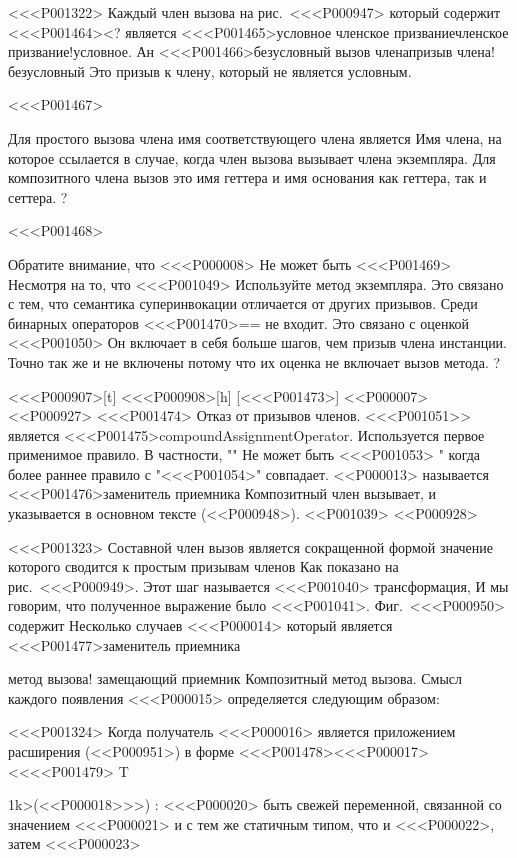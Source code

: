<<<P001322>%
Каждый член вызова на рис.~<<<P000947> который содержит
<<<P001464><? является
<<<P001465>{условное членское призвание}{членское призвание!условное}.
Ан
<<<P001466>{безусловный вызов члена}{призыв члена!безусловный}
Это призыв к члену, который не является условным.

<<<P001467>{%
Для простого вызова члена имя соответствующего члена является
Имя члена, на которое ссылается
в случае, когда член вызова вызывает члена экземпляра.
Для композитного члена вызов это имя геттера
и имя основания как геттера, так и сеттера.%
?

<<<P001468>{%
Обратите внимание, что <<<P000008> Не может быть <<<P001469>
Несмотря на то, что <<<P001049> Используйте метод экземпляра.
Это связано с тем, что семантика суперинвокации отличается от
других призывов.
Среди бинарных операторов <<<P001470>{==} не входит.
Это связано с оценкой <<<P001050>
Он включает в себя больше шагов, чем призыв члена инстанции.
Точно так же \lit{\&\&} и \lit{ | |} не включены
потому что их оценка не включает вызов метода.%
?

<<<P000907>[t]
<<<P000908>[h] [<<<P001473>]
<<P000007>
<<P000927>
%
<<<P001474> Отказ от призывов членов.
<<<P001051>> является <<<P001475>{compoundAssignmentOperator}.
Используется первое применимое правило.
В частности, "" Не может быть <<<P001053> "
когда более раннее правило с "<<<P001054>" совпадает.
<<P000013> называется <<<P001476>{заменитель приемника}
Композитный член вызывает,
и указывается в основном тексте
(<<P000948>).
<<P001039>
<<P000928>

<<<P001323>%
Составной член вызов является сокращенной формой
значение которого сводится к простым призывам членов
Как показано на рис.~<<<P000949>.
Этот шаг называется <<<P001040> трансформация,
И мы говорим, что полученное выражение было <<<P001041>.
Фиг.~<<<P000950> содержит
Несколько случаев <<<P000014>
который является
<<<P001477>{заменитель приемника}{метод вызова! замещающий приемник
Композитный метод вызова.
Смысл каждого появления <<<P000015> определяется следующим образом:

<<<P001324>%
Когда получатель <<<P000016> является приложением расширения
(<<P000951>)
в форме <<<P001478><<<P000017><<<<P001479> T}{1}{k}>(<<P000018>>>)
:
<<<P000020> быть свежей переменной, связанной со значением <<<P000021>
и с тем же статичным типом, что и <<<P000022>,
затем <<<P000023> }}
